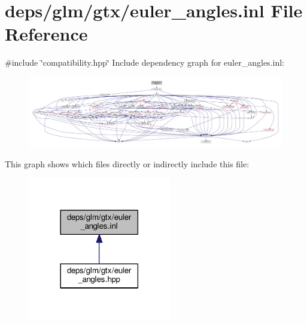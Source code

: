 \hypertarget{euler__angles_8inl}{}\section{deps/glm/gtx/euler\+\_\+angles.inl File Reference}
\label{euler__angles_8inl}
{\ttfamily \#include \char`\"{}compatibility.\+hpp\char`\"{}}\newline
Include dependency graph for euler\+\_\+angles.\+inl\+:
\nopagebreak
\begin{figure}[H]
\begin{center}
\leavevmode
\includegraphics[width=350pt]{d0/da8/euler__angles_8inl__incl}
\end{center}
\end{figure}
This graph shows which files directly or indirectly include this file\+:
\nopagebreak
\begin{figure}[H]
\begin{center}
\leavevmode
\includegraphics[width=177pt]{da/d70/euler__angles_8inl__dep__incl}
\end{center}
\end{figure}
